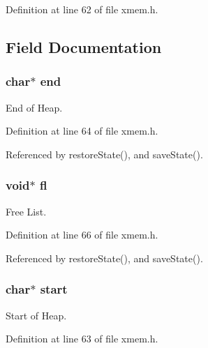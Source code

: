 Definition at line 62 of file xmem.\-h.



\subsection{Field Documentation}
\hypertarget{struct_malloc_state_a8fd806ad19b8f5513a4cf18cbf77532c}{
\subsubsection[{end}]{\setlength{\rightskip}{0pt plus 5cm}char$\ast$ end}}\label{struct_malloc_state_a8fd806ad19b8f5513a4cf18cbf77532c}


End of Heap. 



Definition at line 64 of file xmem.\-h.



Referenced by restore\-State(), and save\-State().

\hypertarget{struct_malloc_state_a2cd9ff81854efd20b4a1e414ac69f3dc}{
\subsubsection[{fl}]{\setlength{\rightskip}{0pt plus 5cm}void$\ast$ fl}}\label{struct_malloc_state_a2cd9ff81854efd20b4a1e414ac69f3dc}


Free List. 



Definition at line 66 of file xmem.\-h.



Referenced by restore\-State(), and save\-State().

\hypertarget{struct_malloc_state_ab40328f79e021050ac262dc0a6019667}{
\subsubsection[{start}]{\setlength{\rightskip}{0pt plus 5cm}char$\ast$ start}}\label{struct_malloc_state_ab40328f79e021050ac262dc0a6019667}


Start of Heap. 



Definition at line 63 of file xmem.\-h.



